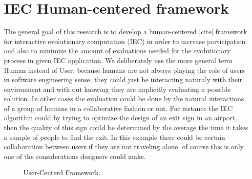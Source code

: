 \documentclass[conference]{IEEEtran}
\begin{document}
\section{IEC Human-centered framework}
\label{sec:graph}
The general goal of this research is to develop a human-centered [cite] framework
for interactive evolutionary computation (IEC) in order to increase
participation and also to minimize the amount of evaluations needed for the
evolutionary process in given IEC application. We deliberately use the more general
term Human instead of User, because humans are not always playing the role of
users in software engineering sense, they could just be interacting 
naturaly with their environment and with out knowing they are implicitly
evaluating a possible solution. In other cases the evaluation could be done
by the natural interactions of a group of humans in a collaborative fashion
or not. For instance the IEC algorithm could by trying to optimize 
the design of an exit sign in an airport, then the quality of this sign could be
determined by the average the time it takes a sample of people to 
find the exit. In this example there could be certain collaboration
between users if they are not traveling alone, of course this is only one of
the considerations designers could make. 
 


\begin{figure}
  \captionsetup{justification=centering,margin=2cm}
  \centering
  \setlength\fboxsep{0pt}
  \setlength\fboxrule{0.7pt}
  \caption{User-Centerd Framework.}
  \label{fig:uc_framework}       
\end{figure}
\end{document}

